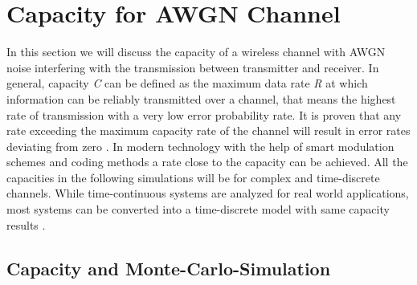 \chapter{Capacity for AWGN Channel} \label{chap:awgnchan}
\graphicspath{{C:/Users/Kevin/Bachelarbeit/Bachelorarbeit/01_Bachelorarbeit_LaTex/02_Figures/}}

In this section we will discuss the capacity of a wireless channel with \gls{AWGN} noise interfering with the transmission between transmitter and receiver. 
\newline
In general, capacity \textit{C} can be defined as the maximum data rate \textit{R} at which information can be reliably transmitted over a channel, that means the highest rate of transmission with a very low error probability rate. It is proven that any rate exceeding the maximum capacity rate of the channel will result in error rates deviating from zero \cite{Shannon}. In modern technology with the help of smart modulation schemes and coding methods a rate close to the capacity can be achieved.
All the capacities in the following simulations will be for complex and time-discrete channels. 
While time-continuous systems are analyzed for real world applications, most systems can be converted into a time-discrete model with same capacity results \cite{Goldsmith08}. 
\section{Capacity and Monte-Carlo-Simulation}
\label{sec:capAWGN}

